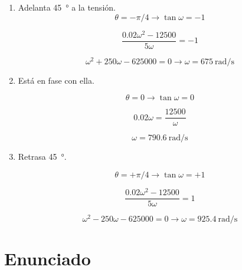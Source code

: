 \begin{enumerate}
\item Adelanta \qty{45}{\degree} a la tensión.
  \begin{equation*}
    \theta = -\pi/4 \rightarrow \tan \omega = -1
  \end{equation*}

  \begin{equation*}
    \frac{0.02\omega^2 - 12500}{5\omega} = -1
  \end{equation*}

  \begin{equation*}
    \omega^2 + 250\omega - 625000 = 0 \rightarrow \boxed{\omega = \qty{675}{\radian\per\second}}
  \end{equation*}

  
\item Está en fase con ella.

  \begin{equation*}
    \theta = 0 \rightarrow \tan \omega = 0
  \end{equation*}

  \begin{equation*}
    0.02\omega = \frac{12500}{\omega}
  \end{equation*}

  \begin{equation*}
    \omega = \qty{790.6}{\radian\per\second}
  \end{equation*}
  
\item Retrasa \qty{45}{\degree}.

  \begin{equation*}
    \theta = +\pi/4 \rightarrow \tan \omega = +1
  \end{equation*}

  \begin{equation*}
    \frac{0.02\omega^2 - 12500}{5\omega} = 1
  \end{equation*}

  \begin{equation*}
    \omega^2 - 250\omega - 625000 = 0 \rightarrow \boxed{\omega = \qty{925.4}{\radian\per\second}}
  \end{equation*}

\end{enumerate}



\section{Enunciado}

